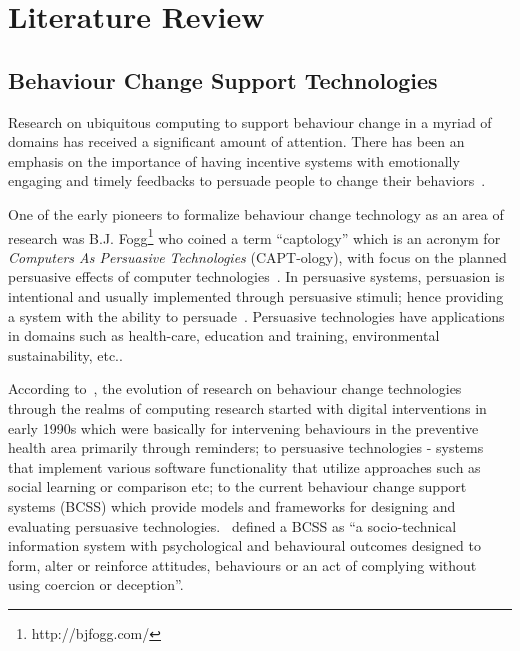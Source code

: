 
\chapter{Literature Review} %

\label{literaturereview} %


\section{Behaviour Change Support Technologies}
Research on ubiquitous computing to support behaviour change in a myriad of domains has received a significant amount of attention. There has been an emphasis on the importance of having incentive systems with emotionally engaging and timely feedbacks to persuade people to change their behaviors~\citep{nakajima2013designing}. 

One of the early pioneers to formalize behaviour change technology as an area of research was B.J. Fogg\footnote{http://bjfogg.com/} who coined a term “captology” which is an acronym for \emph{Computers As Persuasive Technologies} (CAPT-ology), with focus on the planned persuasive effects of computer technologies~\citep{fogg1999persuasive}. In persuasive systems, persuasion is intentional and usually implemented through persuasive stimuli; hence providing a system with the ability to persuade~\citep{hamari2014persuasive}. Persuasive technologies have applications in domains such as health-care, education and training, environmental sustainability, etc..

According to~\cite{langrial2012digital}, the evolution of research on behaviour change technologies through the realms of computing research started with digital interventions in early 1990s which were basically for intervening behaviours in the preventive health area primarily through reminders; to persuasive technologies - systems that implement various software functionality that utilize approaches such as social learning or comparison etc; to the current behaviour change support systems (BCSS) which provide models and frameworks for designing and evaluating persuasive technologies.~\cite{Oinas-Kukkonen:foundation} defined a BCSS  as ``a socio-technical information system with psychological and behavioural outcomes designed to form, alter or reinforce attitudes, behaviours or an act of complying without using coercion or deception''.

